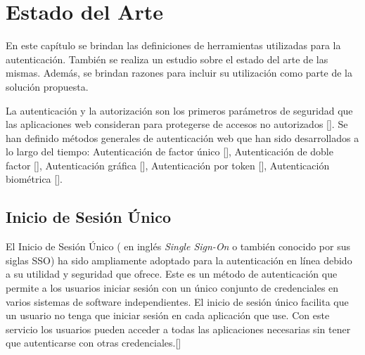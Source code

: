 
\chapter{Estado del Arte}\label{chapter:state-of-the-art}
En este capítulo se brindan las definiciones de herramientas utilizadas para la autenticación. También se realiza un estudio sobre el estado del arte de las mismas. Además, se brindan razones para incluir su utilización como parte de la solución propuesta.

La autenticación y la autorización son los primeros parámetros de seguridad que las aplicaciones web consideran para protegerse de accesos no autorizados [\cite{deitel2014como}]. Se han definido métodos generales de autenticación web que han sido desarrollados a lo largo del tiempo: Autenticación de factor único [\cite{mendoza2020importancia}], Autenticación de doble factor [\cite{lopez2019herramienta}], Autenticación gráfica [\cite{rodriguez2018seguridad}], Autenticación por token [\cite{rodriguez2018seguridad}], Autenticación biométrica [\cite{mantovani2019autenticacion}].

\section{Inicio de Sesión Único}
El Inicio de Sesión Único ( en inglés \textit{Single Sign-On} o también conocido por sus siglas SSO) ha sido ampliamente adoptado para la autenticación en línea debido a su utilidad y seguridad que ofrece. Este es un método de autenticación que permite a los usuarios iniciar sesión con un único conjunto de credenciales en varios sistemas de software independientes. El inicio de sesión único facilita que un usuario no tenga que iniciar sesión en cada aplicación que use. Con este servicio los usuarios pueden acceder a todas las aplicaciones necesarias sin tener que autenticarse con otras credenciales.[\cite{microsoft-doc}]

